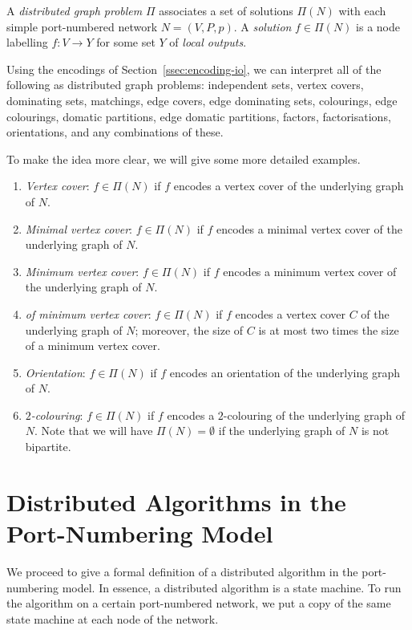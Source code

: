 A \emph{distributed graph problem} $\Pi$ associates a set of solutions $\Pi(N)$ with each simple port-numbered network $N = (V,P,p)$. A \emph{solution} $f \in \Pi(N)$ is a node labelling $f\colon V \to Y$ for some set $Y$ of \emph{local outputs}.

Using the encodings of Section~\ref{ssec:encoding-io}, we can interpret all of the following as distributed graph problems: independent sets, vertex covers, dominating sets, matchings, edge covers, edge dominating sets, colourings, edge colourings, domatic partitions, edge domatic partitions, factors, factorisations, orientations, and any combinations of these.

To make the idea more clear, we will give some more detailed examples.
\begin{enumerate}
    \item \emph{Vertex cover}: $f \in \Pi(N)$ if $f$ encodes a vertex cover of the underlying graph of $N$.
    \item \emph{Minimal vertex cover}: $f \in \Pi(N)$ if $f$ encodes a minimal vertex cover of the underlying graph of $N$.
    \item \emph{Minimum vertex cover}: $f \in \Pi(N)$ if $f$ encodes a minimum vertex cover of the underlying graph of $N$.
    \item \emph{ of minimum vertex cover}: $f \in \Pi(N)$ if $f$ encodes a vertex cover $C$ of the underlying graph of $N$; moreover, the size of $C$ is at most two times the size of a minimum vertex cover.
    \item \emph{Orientation}: $f \in \Pi(N)$ if $f$ encodes an orientation of the underlying graph of $N$.
    \item \emph{$2$-colouring}: $f \in \Pi(N)$ if $f$ encodes a $2$-colouring of the underlying graph of $N$. Note that we will have $\Pi(N) = \emptyset$ if the underlying graph of $N$ is not bipartite.
\end{enumerate}


\section{Distributed Algorithms in the Port-Numbering Model}\label{sec:distr-alg}

We proceed to give a formal definition of a distributed algorithm in the port-numbering model. In essence, a distributed algorithm is a state machine. To run the algorithm on a certain port-numbered network, we put a copy of the same state machine at each node of the network.

